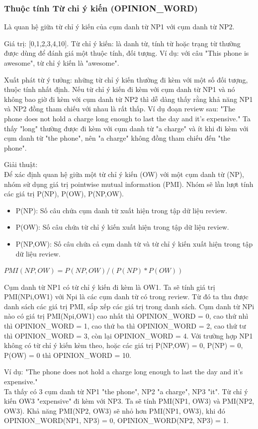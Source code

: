 \documentclass[12pt]{extarticle}
\begin{document}
			\subsubsection*{Thuộc tính Từ chỉ ý kiến (OPINION\_WORD)}
				\par Là quan hệ giữa từ chỉ ý kiến của cụm danh từ NP1 với cụm danh từ NP2.
				\par Giá trị: [0,1,2,3,4,10]. Từ chỉ ý kiến: là danh từ, tính từ hoặc trạng từ thường được dùng để đánh giá một thuộc tính, đối tượng. Ví dụ: với câu "This phone is awesome", từ chỉ ý kiến là "awesome".
				\par Xuất phát từ ý tưởng: những từ chỉ ý kiến thường đi kèm với một số đối tượng, thuộc tính nhất định. Nếu từ chỉ ý kiến đi kèm với cụm danh từ NP1 và nó không bao giờ đi kèm với cụm danh từ NP2 thì dễ dàng thấy rằng khả năng NP1 và NP2 đồng tham chiếu với nhau là rất thấp. Ví dụ đoạn review sau: "The phone does not hold a charge long enough to last the day and it’s expensive." Ta thấy "long" thường được đi kèm với cụm danh từ "a charge" và ít khi đi kèm với cụm danh từ "the phone", nên "a charge" không đồng tham chiếu đến "the phone".
				\par Giải thuật:
				\\Để xác định quan hệ giữa một từ chỉ ý kiến (OW) với một cụm danh từ (NP), nhóm sử dụng giá trị pointwise mutual information (PMI). Nhóm sẽ lần lượt tính các giá trị P(NP), P(OW), P(NP,OW).
				\begin{itemize}
					\item{P(NP): Số câu chứa cụm danh từ xuất hiện trong tập dữ liệu review.}
					\item{P(OW): Số câu chứa từ chỉ ý kiến xuất hiện trong tập dữ liệu review.}
					\item{P(NP,OW): Số câu chứa cả cụm danh từ và từ chỉ ý kiến xuất hiện trong tập dữ liệu review.}
				\end{itemize}
				\begin{center}
					$PMI(NP,OW) = P(NP,OW)/(P(NP)*P(OW))$
				\end{center}
				\par Cụm danh từ NP1 có từ chỉ ý kiến đi kèm là OW1. Ta sẽ tính giá trị PMI(NPi,OW1) với Npi là các cụm danh từ có trong review. Từ đó ta thu được danh sách các giá trị PMI, sắp xếp các giá trị trong danh sách. Cụm danh từ NPi nào có giá trị PMI(Npi,OW1) cao nhất thì OPINION\_WORD = 0, cao thứ nhì thì OPINION\_WORD = 1, cao thứ ba thì OPINION\_WORD = 2, cao thứ tư thì OPINION\_WORD = 3, còn lại OPINION\_WORD = 4. Với trường hợp NP1 không có từ chỉ ý kiến kèm theo, hoặc các giá trị P(NP,OW) = 0, P(NP) = 0, P(OW) = 0 thì  OPINION\_WORD = 10.
				\par Ví dụ: "The phone does not hold a charge long enough to last the day and it’s expensive."
				\\Ta thấy có 3 cụm danh từ NP1 "the phone", NP2 "a charge", NP3 "it". Từ chỉ ý kiến OW3 "expensive" đi kèm với NP3. Ta sẽ tính PMI(NP1, OW3) và PMI(NP2, OW3). Khả năng PMI(NP2, OW3) sẽ nhỏ hơn PMI(NP1, OW3), khi đó OPINION\_WORD(NP1, NP3) = 0, OPINION\_WORD(NP2, NP3) = 1.
\end{document}
